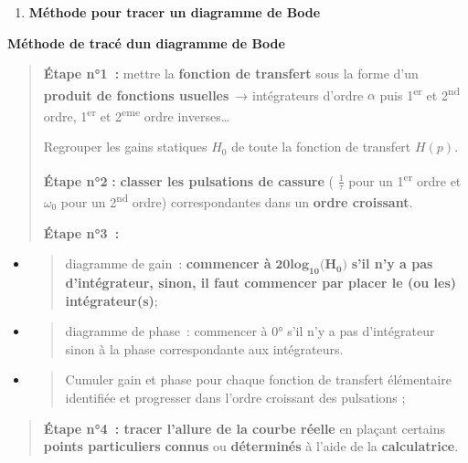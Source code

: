 \begin{enumerate}
\def\labelenumi{\arabic{enumi}.}
\setcounter{enumi}{7}
\item
  \protect\hypertarget{_Toc99121133}{}{}\textbf{Méthode pour tracer un diagramme de Bode}
\end{enumerate}

\textbf{Méthode de tracé d\textquotesingle un diagramme de Bode}

\begin{quote}
\textbf{Étape n°1~:} mettre la \textbf{fonction de transfert} sous la forme d'un \textbf{produit de fonctions usuelles}~→ intégrateurs d'ordre \(\alpha\) puis 1\textsuperscript{er} et 2\textsuperscript{nd} ordre, 1\textsuperscript{er} et 2\textsuperscript{eme} ordre inverses\ldots{}

Regrouper les gains statiques \(H_{0}\) de toute la fonction de transfert \(H(p)\).

\textbf{Étape n°2} \textbf{:} \textbf{classer les pulsations de cassure} ( \(\frac{1}{\tau}\) pour un 1\textsuperscript{er} ordre et \(\omega_{0}\) pour un 2\textsuperscript{nd} ordre) correspondantes dans un \textbf{ordre croissant}.

\textbf{Étape n°3~:}
\end{quote}

\begin{itemize}
\item
  \begin{quote}
  diagramme de gain~: \textbf{commencer à} \(\mathbf{20}\mathbf{lo}\mathbf{g}_{\mathbf{10}}\mathbf{(}\mathbf{H}_{\mathbf{0}}\mathbf{)}\) \textbf{s'il n'y a pas d'intégrateur, sinon, il faut commencer par placer le (ou les) intégrateur(s)};
  \end{quote}
\item
  \begin{quote}
  diagramme de phase~: commencer à 0° s'il n'y a pas d'intégrateur sinon à la phase correspondante aux intégrateurs.
  \end{quote}
\item
  \begin{quote}
  Cumuler gain et phase pour chaque fonction de transfert élémentaire identifiée et progresser dans l'ordre croissant des pulsations ;
  \end{quote}
\end{itemize}

\begin{quote}
\textbf{Étape n°4~: tracer l'allure de la courbe réelle} en plaçant certains \textbf{points particuliers} \textbf{connus} ou \textbf{déterminés} à l'aide de la \textbf{calculatrice}.
\end{quote}

